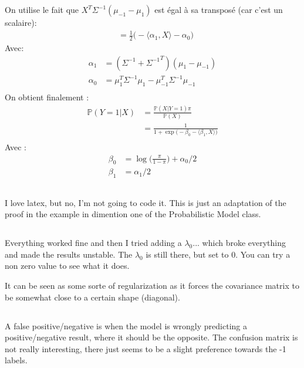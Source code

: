 \documentclass{article}
\newcommand{\pr}{\mathbb{P}}
\begin{document}
On utilise le fait que $X^T\Sigma^{-1}(\mu_{-1} - \mu_1)$ est égal à sa transposé (car c'est un scalaire):
\begin{align*}
    &= \frac 1 2 \big(-\langle\alpha_1, X \rangle - \alpha_0\big)
\end{align*}
Avec:
\begin{align*}
    \alpha_1 &= (\Sigma^{-1} + {\Sigma^{-1}}^T)(\mu_{1} - \mu_{-1})\\
    \alpha_0 &= \mu_1^T\Sigma^{-1}\mu_1 - \mu_{-1}^T\Sigma^{-1}\mu_{-1}\\
\end{align*}
On obtient finalement :
\begin{align*}
\pr(Y=1|X) &= \frac{\pr(X|Y=1)\pi}{\pr(X)}\\
&= \frac 1 {1 + \exp\big(-\beta_0 - \langle\beta_1, X\rangle \big)}\\
\end{align*}
Avec :
\begin{align*}
\beta_0 &= \log\big(\frac\pi{1-\pi}\big) + \alpha_0/2 \\
\beta_1 &= \alpha_1/2
\end{align*}

\subsection{}

I love latex, but no, I'm not going to code it. This is just an adaptation of the proof in the example in dimention one of the Probabilistic Model class.

\subsection{}

Everything worked fine and then I tried adding a $\lambda_0$... which broke everything and made the results unstable. The $\lambda_0$ is still there, but set to 0. You can try a non zero value to see what it does.

It can be seen as some sorte of regularization as it forces the covariance matrix to be somewhat close to a certain shape (diagonal).

\subsection{}

A false positive/negative is when the model is wrongly predicting a positive/negative result, where it should be the opposite. The confusion matrix is not really interesting, there just seems to be a slight preference towards the -1 labels.
\end{document}
